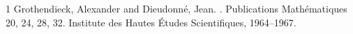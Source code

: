 \begin{thebibliography}{1}
Grothendieck, Alexander and Dieudonn{\'e}, Jean.
.
\newblock Publications {M}ath{\'e}matiques 20, 24, 28, 32. Institute des {H}autes {\'E}tudes {S}cientifiques, 1964--1967.
\end{thebibliography}
